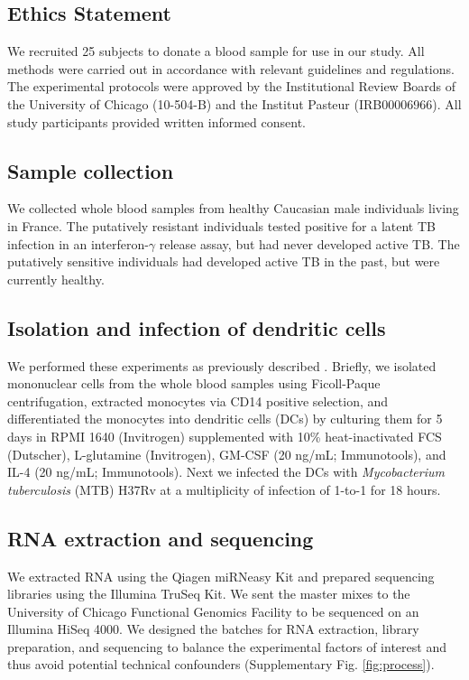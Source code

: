 \subsection{Ethics Statement}

We recruited 25 subjects to donate a blood sample for use in our
study. All methods were carried out in accordance with relevant
guidelines and regulations. The experimental protocols were approved
by the Institutional Review Boards of the University of Chicago
(10-504-B) and the Institut Pasteur (IRB00006966). All study
participants provided written informed consent.
\subsection{Sample collection}

We collected whole blood samples from healthy Caucasian male
individuals living in France. The putatively resistant individuals
tested positive for a latent TB infection in an interferon-$\gamma$
release assay, but had never developed active TB. The putatively
sensitive individuals had developed active TB in the past, but were
currently healthy.
\subsection{Isolation and infection of dendritic cells}

We performed these experiments as previously described
\citep{Barreiro2012}. Briefly, we isolated mononuclear cells from the
whole blood samples using Ficoll-Paque centrifugation, extracted
monocytes via CD14 positive selection, and differentiated the
monocytes into dendritic cells (DCs) by culturing them for 5 days in
RPMI 1640 (Invitrogen) supplemented with 10\% heat-inactivated FCS
(Dutscher), L-glutamine (Invitrogen), GM-CSF (20 ng/mL; Immunotools),
and IL-4 (20 ng/mL; Immunotools). Next we infected the DCs with
\emph{Mycobacterium tuberculosis} (MTB) H37Rv at a multiplicity of
infection of 1-to-1 for 18 hours.
\subsection{RNA extraction and sequencing}

We extracted RNA using the Qiagen miRNeasy Kit and prepared sequencing
libraries using the Illumina TruSeq Kit. We sent the master mixes to
the University of Chicago Functional Genomics Facility to be sequenced
on an Illumina HiSeq 4000. We designed the batches for RNA extraction,
library preparation, and sequencing to balance the experimental
factors of interest and thus avoid potential technical confounders
(Supplementary Fig. \ref{fig:process}).
